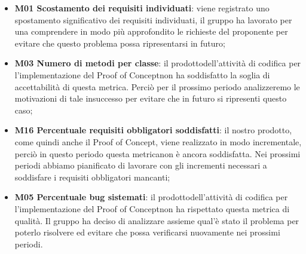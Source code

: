 \begin{itemize}
	\item \textbf{M01 Scostamento dei requisiti individuati}: viene registrato uno spostamento significativo dei requisiti individuati, il gruppo ha lavorato per una comprendere in modo più approfondito le richieste del proponente per evitare che questo problema possa ripresentarsi in futuro;
	\item \textbf{M03 Numero di metodi per classe}: il prodotto\glosp dell'attività di codifica per l'implementazione del Proof of Concept\glosp non ha soddisfatto la soglia di accettabilità di questa metrica\glo. Perciò per il prossimo periodo analizzeremo le motivazioni di tale insuccesso per evitare che in futuro si ripresenti questo caso;
	\item \textbf{M16 Percentuale requisiti obbligatori soddisfatti}: il nostro prodotto\glo, come quindi anche il Proof of Concept\glo, viene realizzato in modo incrementale, perciò in questo periodo questa metrica\glosp non è ancora soddisfatta. Nei prossimi periodi abbiamo pianificato di lavorare con gli incrementi necessari a soddisfare i requisiti obbligatori mancanti;
	\item \textbf{M05 Percentuale bug sistemati}: il prodotto\glosp dell'attività di codifica per l'implementazione del Proof of Concept\glosp non ha rispettato questa metrica di qualità. Il gruppo ha deciso di analizzare assieme qual'è stato il problema per poterlo risolvere ed evitare che possa verificarsi nuovamente nei prossimi periodi.
\end{itemize}  

